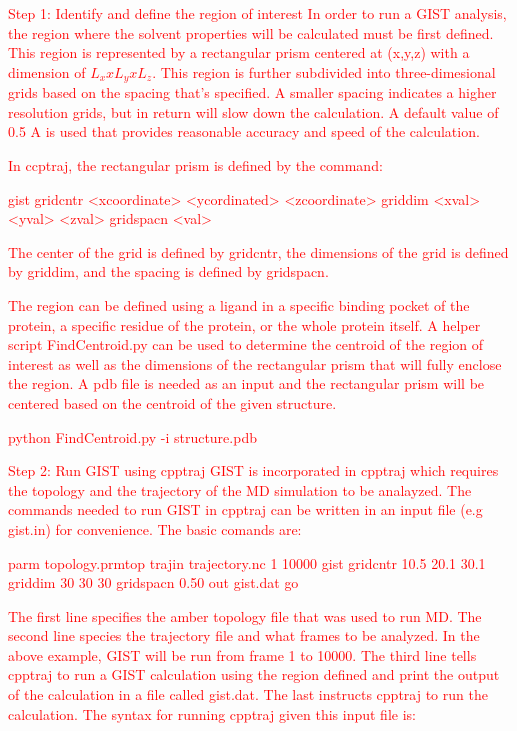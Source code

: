 \documentclass[9pt,tutorial]{livecoms}
\newcommand{\todo}{\textcolor{red}}
\begin{document}
\todo{Step 1: Identify and define the region of interest
In order to run a GIST analysis, the region where the solvent properties will be calculated must be first defined. This region is represented by a rectangular prism centered at (x,y,z) with a dimension of $L_x x L_y x L_z$. This region is further subdivided into three-dimesional grids based on the spacing that's specified. A smaller spacing indicates a higher resolution grids, but in return will slow down the calculation.  A default value of 0.5 A is used that provides reasonable accuracy and speed of the calculation.  }

\todo{In ccptraj, the rectangular prism is defined by the command:}

\todo {gist gridcntr <xcoordinate>  <ycordinated> <zcoordinate> griddim <xval> <yval> <zval> gridspacn <val>
}

\todo{The center of the grid is defined by gridcntr, the dimensions of the grid is defined by griddim, and the spacing is defined by gridspacn.}

\todo{The region can be defined using a ligand in a specific binding pocket of the protein, a specific residue of the protein, or the whole protein itself. A helper script FindCentroid.py can be used to determine the centroid of the region of interest as well as the dimensions of the rectangular prism that will fully enclose the region. A pdb file is needed as an input and the rectangular prism will be centered based on the centroid of the given structure.}

\todo {python FindCentroid.py -i structure.pdb  }

\todo{Step 2: Run GIST using cpptraj}
\todo{GIST is incorporated in cpptraj which requires the topology and the trajectory of the MD simulation to be analayzed. The commands needed to run GIST in cpptraj can be written in an input file (e.g gist.in) for convenience. The basic comands are:}

\todo{parm topology.prmtop}
\todo{trajin trajectory.nc 1 10000}
\todo{gist gridcntr 10.5 20.1 30.1 griddim 30 30 30 gridspacn 0.50 out gist.dat}
\todo{go}

\todo{The first line specifies the amber topology file that was used to run MD. The second line species the trajectory file and what frames to be analyzed. In the above example, GIST will be run from frame 1 to 10000. The third line tells cpptraj to run a GIST calculation using the region defined and print the output of the calculation in a file called gist.dat. The last instructs cpptraj to run the calculation. The syntax for running cpptraj given this input file is:}
\end{document}
